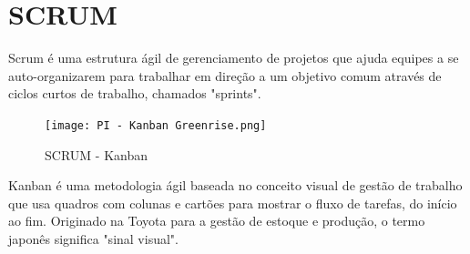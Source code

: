 \documentclass[
  a4paper,
  12pt,
  english,
  brazilian,
]{article}
\begin{document}
\section*{SCRUM}
Scrum é uma estrutura ágil de gerenciamento de projetos que ajuda equipes a se auto-organizarem para trabalhar em direção a um objetivo comum através de ciclos curtos de trabalho, chamados "sprints".

\begin{figure}[H] %
\centering
\caption{SCRUM - Kanban}
\texttt{[image: PI - Kanban Greenrise.png]}
\end{figure}

Kanban é uma metodologia ágil baseada no conceito visual de gestão de trabalho que usa quadros com colunas e cartões para mostrar o fluxo de tarefas, do início ao fim. Originado na Toyota para a gestão de estoque e produção, o termo japonês significa "sinal visual".
\end{document}
